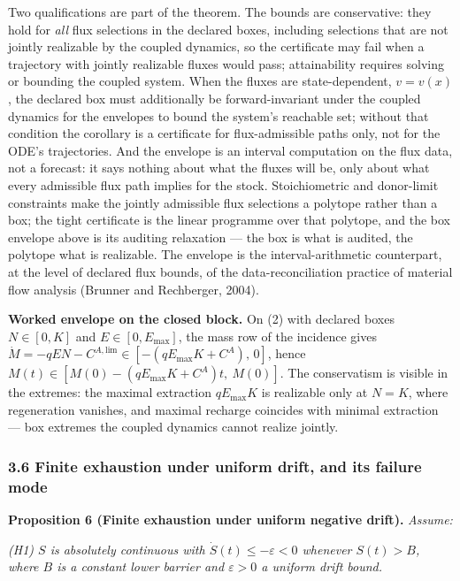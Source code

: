 \documentclass[11pt]{article}
\begin{document}
Two qualifications are part of the theorem. The bounds are conservative:
they hold for \emph{all} flux selections in the declared boxes,
including selections that are not jointly realizable by the coupled
dynamics, so the certificate may fail when a trajectory with jointly
realizable fluxes would pass; attainability requires solving or bounding
the coupled system. When the fluxes are state-dependent, \(v = v(x)\),
the declared box must additionally be forward-invariant under the
coupled dynamics for the envelopes to bound the system's reachable set;
without that condition the corollary is a certificate for
flux-admissible paths only, not for the ODE's trajectories. And the
envelope is an interval computation on the flux data, not a forecast: it
says nothing about what the fluxes will be, only about what every
admissible flux path implies for the stock. Stoichiometric and
donor-limit constraints make the jointly admissible flux selections a
polytope rather than a box; the tight certificate is the linear
programme over that polytope, and the box envelope above is its auditing
relaxation --- the box is what is audited, the polytope what is
realizable. The envelope is the interval-arithmetic counterpart, at the
level of declared flux bounds, of the data-reconciliation practice of
material flow analysis (Brunner and Rechberger, 2004).

\textbf{Worked envelope on the closed block.} On (2) with declared boxes
\(N \in [0, K]\) and \(E \in [0, E_{\max}]\), the mass row of the
incidence gives
\(\dot M = -qEN - C^{A,\mathrm{lim}} \in [-(qE_{\max}K + C^A),\, 0]\),
hence \(M(t) \in [M(0) - (qE_{\max}K + C^A)t,\ M(0)]\). The conservatism
is visible in the extremes: the maximal extraction \(qE_{\max}K\) is
realizable only at \(N = K\), where regeneration vanishes, and maximal
recharge coincides with minimal extraction --- box extremes the coupled
dynamics cannot realize jointly.

\subsubsection{3.6 Finite exhaustion under uniform drift, and its
failure
mode}\label{finite-exhaustion-under-uniform-drift-and-its-failure-mode}

\textbf{Proposition 6 (Finite exhaustion under uniform negative drift).}
\emph{Assume:}

\emph{(H1) \(S\) is absolutely continuous with
\(\dot S(t) \le -\varepsilon < 0\) whenever \(S(t) > B\), where \(B\) is
a constant lower barrier and \(\varepsilon > 0\) a uniform drift bound.}
\end{document}

